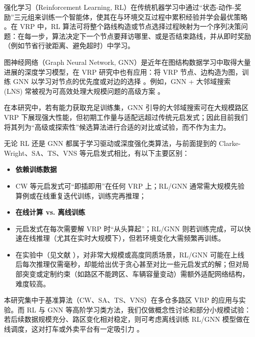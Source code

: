 \documentclass[12pt,a4paper,twoside]{ctexbook}
\begin{document}
强化学习（Reinforcement Learning, RL）在传统机器学习中通过“状态-动作-奖励”三元组来训练一个智能体，使其在与环境交互过程中累积经验并学会最优策略 \cite{rl_intro}。在 VRP 中，RL 算法可将整个路线构造或节点选择过程映射为一个序列决策问题：在每一步，算法决定下一个节点要拜访哪里、或是否结束路线，并从即时奖励（例如节省行驶距离、避免超时）中学习。

图神经网络（Graph Neural Network, GNN）是近年在图结构数据学习中取得大量进展的深度学习模型，在 VRP 研究中也有应用：将 VRP 节点、边构造为图，训练 GNN 以学习对节点的优先度或对边的选择 \cite{gnn_intro}。例如，GNN + 大邻域搜索 (LNS) 常被视为可高效处理大规模问题的高级方案 \cite{gnn_lns}。


在本研究中，若有能力获取充足训练集，GNN 引导的大邻域搜索可在大规模路区 VRP 下展现强大性能，但初期工作量与适配远超过传统元启发式；因此目前我们将其列为“高级或探索性”候选算法进行合适的对比或试验，而不作为主力。

无论 RL 还是 GNN 都属于学习驱动或深度强化类算法，与前面提到的 Clarke-Wright、SA、TS、VNS 等元启发式相比，有以下主要区别：

    \begin{itemize}
        \item \textbf{依赖训练数据}
        \item CW 等元启发式可“即插即用”在任何 VRP 上；RL/GNN 通常需大规模先验算例或在线重复迭代训练，训练完再推理；
    \end{itemize}
    \begin{itemize}
    \item \textbf{在线计算 vs. 离线训练}

        \item 元启发式在每次需要解 VRP 时“从头算起”；RL/GNN 则若训练完成，可以快速在线推理（尤其在实时大规模下），但若环境变化大需频繁再训练。
    \end{itemize}

    \begin{itemize}
        \item 在实验中（见文献 \cite{rl_performance,gnn_performance}），对非常大规模或高度同质场景，RL/GNN 可能在上线后每次推理仅需毫秒，却能给出优于贪心甚至对比一些元启发式的解；但对局部突变或定制约束（如路区不能跨区、车辆容量变动）需额外适配网络结构，难度较高。
    \end{itemize}
本研究集中于基准算法（CW、SA、TS、VNS）在多仓多路区 VRP 的应用与实验。而 RL 与 GNN 等高阶学习类方法，我们仅做概念性讨论和部分小规模试验：若后续数据规模充分、路区变化相对稳定，则可考虑离线训练 RL/GNN 模型做在线调度，这对打车或外卖平台有一定吸引力 \cite{gnn_rl_application}。
\end{document}
